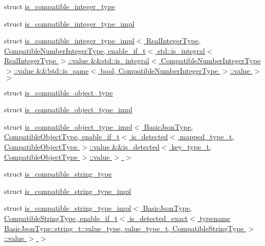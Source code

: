 \begin{DoxyCompactItemize}
\item 
struct \hyperlink{structnlohmann_1_1detail_1_1is__compatible__integer__type}{is\+\_\+compatible\+\_\+integer\+\_\+type}
\item 
struct \hyperlink{structnlohmann_1_1detail_1_1is__compatible__integer__type__impl}{is\+\_\+compatible\+\_\+integer\+\_\+type\+\_\+impl}
\item 
struct \hyperlink{structnlohmann_1_1detail_1_1is__compatible__integer__type__impl_3_01RealIntegerType_00_01Compatie5920c849e839ebb9f8c57349c900796}{is\+\_\+compatible\+\_\+integer\+\_\+type\+\_\+impl$<$ Real\+Integer\+Type, Compatible\+Number\+Integer\+Type, enable\+\_\+if\+\_\+t$<$ std\+::is\+\_\+integral$<$ Real\+Integer\+Type $>$\+::value \&\&std\+::is\+\_\+integral$<$ Compatible\+Number\+Integer\+Type $>$\+::value \&\&!std\+::is\+\_\+same$<$ bool, Compatible\+Number\+Integer\+Type $>$\+::value $>$ $>$}
\item 
struct \hyperlink{structnlohmann_1_1detail_1_1is__compatible__object__type}{is\+\_\+compatible\+\_\+object\+\_\+type}
\item 
struct \hyperlink{structnlohmann_1_1detail_1_1is__compatible__object__type__impl}{is\+\_\+compatible\+\_\+object\+\_\+type\+\_\+impl}
\item 
struct \hyperlink{structnlohmann_1_1detail_1_1is__compatible__object__type__impl_3_01BasicJsonType_00_01Compatible1dd1bd23ba0e4ce33237aa702f8058a9}{is\+\_\+compatible\+\_\+object\+\_\+type\+\_\+impl$<$ Basic\+Json\+Type, Compatible\+Object\+Type, enable\+\_\+if\+\_\+t$<$ is\+\_\+detected$<$ mapped\+\_\+type\+\_\+t, Compatible\+Object\+Type $>$\+::value \&\&is\+\_\+detected$<$ key\+\_\+type\+\_\+t, Compatible\+Object\+Type $>$\+::value $>$ $>$}
\item 
struct \hyperlink{structnlohmann_1_1detail_1_1is__compatible__string__type}{is\+\_\+compatible\+\_\+string\+\_\+type}
\item 
struct \hyperlink{structnlohmann_1_1detail_1_1is__compatible__string__type__impl}{is\+\_\+compatible\+\_\+string\+\_\+type\+\_\+impl}
\item 
struct \hyperlink{structnlohmann_1_1detail_1_1is__compatible__string__type__impl_3_01BasicJsonType_00_01Compatible494e9dc742c819c61e54b8282030b5b6}{is\+\_\+compatible\+\_\+string\+\_\+type\+\_\+impl$<$ Basic\+Json\+Type, Compatible\+String\+Type, enable\+\_\+if\+\_\+t$<$ is\+\_\+detected\+\_\+exact$<$ typename Basic\+Json\+Type\+::string\+\_\+t\+::value\+\_\+type, value\+\_\+type\+\_\+t, Compatible\+String\+Type $>$\+::value $>$ $>$}
\item 

\end{DoxyCompactItemize}
